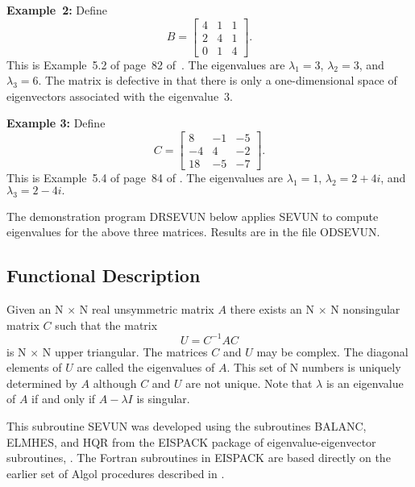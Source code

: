 \documentclass[twoside]{MATH77}
\begin{document}
{\bf Example~2:} Define
\begin{equation*}
B=\left[
\begin{array}{ccc}
4 & 1 & 1 \\
2 & 4 & 1 \\
0 & 1 & 4
\end{array}
\right] .
\end{equation*}
This is Example~5.2 of page~82 of~\cite{Gregory:1969:ACM}.  The
eigenvalues are $\lambda _1 = 3 $, $\lambda _2 = 3$, and $\lambda _3 = 6$.
The matrix is defective in that there is only a one-dimensional space of
eigenvectors associated with the eigenvalue~3.

{\bf Example 3:} Define
\begin{equation*}
C=\left[
\begin{array}{rrr}
8 & -1 & -5 \\
-4 & 4 & -2 \\
18 & -5 & -7
\end{array}
\right] .
\end{equation*}
This is Example~5.4 of page~84 of \cite{Gregory:1969:ACM}.  The
eigenvalues are $\lambda _1 = 1 $, $\lambda _2 = 2 + 4i$, and $\lambda _3
= 2 - 4i.$

The demonstration program DRSEVUN below applies SEVUN to compute eigenvalues
for the above three matrices. Results are in the file ODSEVUN.

\subsection{Functional Description}

Given an N $\times $ N real unsymmetric matrix $A$ there exists an N $\times $ N
nonsingular matrix $C$ such that the matrix
\begin{equation*}
U=C^{-1}AC
\end{equation*}
is N $\times $ N upper triangular. The matrices $C$ and $U$ may be complex. The
diagonal elements of $U$ are called the eigenvalues of $A$. This set of N
numbers is uniquely determined by $A$ although $C$ and $U$ are not unique.
Note that $\lambda $ is an eigenvalue of $A$ if and only if $A - \lambda I$
is singular.

This subroutine SEVUN was developed using the subroutines BALANC, ELMHES,
and HQR from the EISPACK package of eigenvalue-eigenvector subroutines,
\cite{Smith:1974:MER}. The Fortran subroutines in EISPACK
are based directly on the earlier set of Algol procedures described in
\cite{Wilkinson:1971:HAC}.
\end{document}
